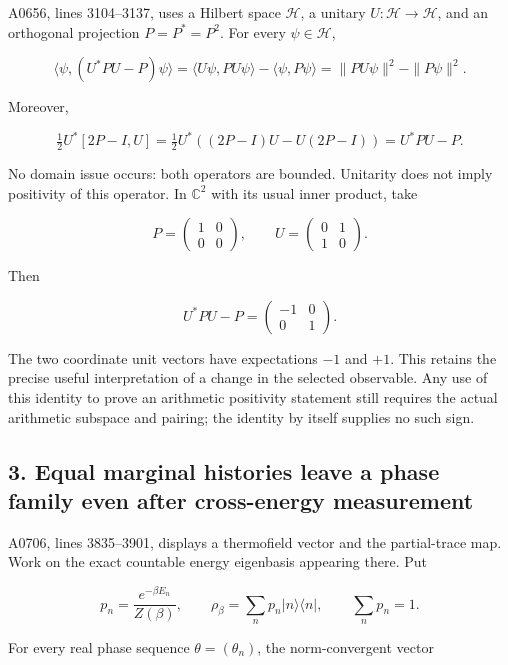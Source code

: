 A0656, lines 3104--3137, uses a Hilbert space \(\mathcal H\), a unitary
\(U:\mathcal H\to\mathcal H\), and an orthogonal projection
\(P=P^*=P^2\). For every \(\psi\in\mathcal H\),

\[
\langle\psi,(U^*PU-P)\psi\rangle
=\langle U\psi,PU\psi\rangle-\langle\psi,P\psi\rangle
=\|PU\psi\|^2-\|P\psi\|^2.
\]

Moreover,

\[
\tfrac12U^*[2P-I,U]
=\tfrac12U^*((2P-I)U-U(2P-I))
=U^*PU-P.
\]

No domain issue occurs: both operators are bounded. Unitarity does not
imply positivity of this operator. In \(\mathbb C^2\) with its usual
inner product, take

\[
P=\begin{pmatrix}1&0\\0&0\end{pmatrix},
\qquad U=\begin{pmatrix}0&1\\1&0\end{pmatrix}.
\]

Then

\[
U^*PU-P=\begin{pmatrix}-1&0\\0&1\end{pmatrix}.
\]

The two coordinate unit vectors have expectations \(-1\) and \(+1\).
This retains the precise useful interpretation of a change in the
selected observable. Any use of this identity to prove an arithmetic
positivity statement still requires the actual arithmetic subspace and
pairing; the identity by itself supplies no such sign.

\subsection{3. Equal marginal histories leave a phase family even after
cross-energy
measurement}\label{proof10:equal-marginal-histories-leave-a-phase-family-even-after-cross-energy-measurement}

A0706, lines 3835--3901, displays a thermofield vector and the
partial-trace map. Work on the exact countable energy eigenbasis
appearing there. Put

\[
p_n=\frac{e^{-\beta E_n}}{Z(\beta)},\qquad
\rho_\beta=\sum_n p_n|n\rangle\langle n|,
\qquad \sum_n p_n=1.
\]

For every real phase sequence \(\theta=(\theta_n)\), the norm-convergent
vector

